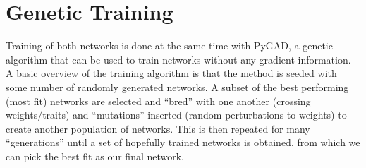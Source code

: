 \documentclass{article}
\begin{document}
\section{Genetic Training}
Training of both networks is done at the same time with PyGAD\cite{gad2021pygad}, a genetic algorithm that can be used to train networks without any gradient information.  A basic overview of the training algorithm is that the method is seeded with some number of randomly generated networks. A subset of the best performing (most fit) networks are selected and ``bred'' with one another (crossing weights/traits) and ``mutations'' inserted (random perturbations to weights) to create another population of networks.  This is then repeated for many ``generations'' until a set of hopefully trained networks is obtained, from which we can pick the best fit as our final network.
\end{document}
